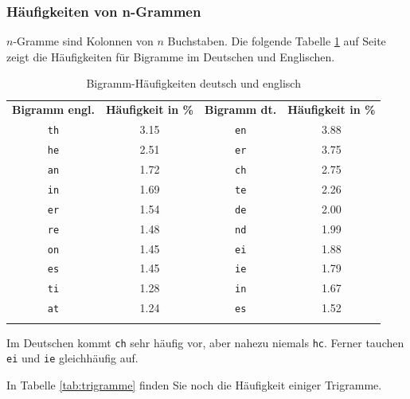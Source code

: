 \documentclass[%
11pt,%
twoside,%
titlepage,%
german,%
headsepline%
]{scrartcl}
\newcommand{\spaltenheight}{\rule{0mm}{3ex}}
\newcommand{\spaltensep}{\\[1ex]}
\begin{document}
\subsubsection{Häufigkeiten von n-Grammen}

$n$-Gramme sind Kolonnen von $n$ Buchstaben. Die folgende Tabelle \ref{tab:bigramme} auf Seite \pageref{tab:bigramme} zeigt die Häufigkeiten für Bigramme im Deutschen und Englischen.

\begin{table}
\begin{center}
\begin{tabular}{|c|c||c|c|}
\hhline{--||--}
\rowcolor{lightyellow}\spaltenheight \textbf{Bigramm engl.} &	\textbf{Häufigkeit in \%} &	\textbf{Bigramm dt.} &	\textbf{Häufigkeit in \%}\spaltensep\hhline{--||--}
\rowcolor{Gray}\spaltenheight \texttt{th}&	3.15&	\texttt{en}&	3.88\spaltensep\hhline{--||--}
\rowcolor{lightyellow}\spaltenheight \texttt{he}&	2.51&	\texttt{er}&	3.75\spaltensep\hhline{--||--}
\rowcolor{Gray}\spaltenheight \texttt{an}&	1.72&	\texttt{ch}&	2.75\spaltensep\hhline{--||--}
\rowcolor{lightyellow}\spaltenheight \texttt{in}&	1.69&	\texttt{te}&	2.26\spaltensep\hhline{--||--}
\rowcolor{Gray}\spaltenheight \texttt{er}&	1.54&	\texttt{de}&	2.00\spaltensep\hhline{--||--}
\rowcolor{lightyellow}\spaltenheight \texttt{re}&	1.48&	\texttt{nd}&	1.99\spaltensep\hhline{--||--}
\rowcolor{Gray}\spaltenheight \texttt{on}&	1.45&	\texttt{ei}&	1.88\spaltensep\hhline{--||--}
\rowcolor{lightyellow}\spaltenheight \texttt{es}&	1.45&	\texttt{ie}&	1.79\spaltensep\hhline{--||--}
\rowcolor{Gray}\spaltenheight \texttt{ti}&	1.28&	\texttt{in}&	1.67\spaltensep\hhline{--||--}
\rowcolor{lightyellow}\spaltenheight \texttt{at}&	1.24&	\texttt{es}&	1.52\spaltensep\hhline{--||--}
\end{tabular}
\end{center}
\caption{Bigramm-Häufigkeiten deutsch und englisch}\label{tab:bigramme}
\end{table}

Im Deutschen kommt \texttt{ch} sehr häufig vor, aber nahezu niemals \texttt{hc}. Ferner tauchen \texttt{ei} und \texttt{ie} gleichhäufig auf.

In Tabelle \ref{tab:trigramme} finden Sie noch die Häufigkeit einiger Trigramme.
\end{document}
